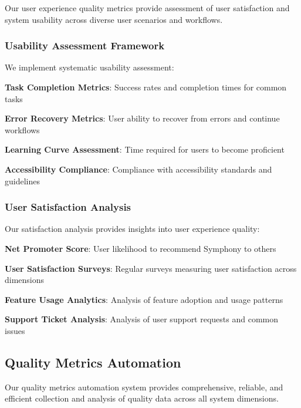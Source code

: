 Our user experience quality metrics provide assessment of user satisfaction and system usability across diverse user scenarios and workflows.

\subsubsection*{Usability Assessment Framework}

We implement systematic usability assessment:

\begin{compactlist}
    \item \textbf{Task Completion Metrics}: Success rates and completion times for common tasks
    \item \textbf{Error Recovery Metrics}: User ability to recover from errors and continue workflows
    \item \textbf{Learning Curve Assessment}: Time required for users to become proficient
    \item \textbf{Accessibility Compliance}: Compliance with accessibility standards and guidelines
\end{compactlist}

\subsubsection*{User Satisfaction Analysis}

Our satisfaction analysis provides insights into user experience quality:

\begin{expandedlist}
    \item \textbf{Net Promoter Score}: User likelihood to recommend Symphony to others
    \item \textbf{User Satisfaction Surveys}: Regular surveys measuring user satisfaction across dimensions
    \item \textbf{Feature Usage Analytics}: Analysis of feature adoption and usage patterns
    \item \textbf{Support Ticket Analysis}: Analysis of user support requests and common issues
\end{expandedlist}

\subsection*{Quality Metrics Automation}

Our quality metrics automation system provides comprehensive, reliable, and efficient collection and analysis of quality data across all system dimensions.

